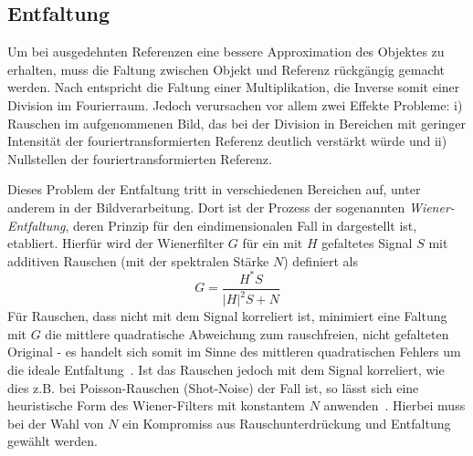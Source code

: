 \subsection{Entfaltung}
Um bei ausgedehnten Referenzen eine bessere Approximation des Objektes zu erhalten, muss die Faltung zwischen Objekt und Referenz rückgängig gemacht werden. Nach  entspricht die Faltung einer Multiplikation, die Inverse somit einer Division im Fourierraum. Jedoch verursachen vor allem zwei Effekte Probleme: i) Rauschen im aufgenommenen Bild, das bei der Division in Bereichen mit geringer Intensität der fouriertransformierten Referenz deutlich verstärkt würde und ii) Nullstellen der fouriertransformierten Referenz. 

Dieses Problem der Entfaltung tritt in verschiedenen Bereichen auf, unter anderem in der Bildverarbeitung.
Dort ist der Prozess der sogenannten \textit{Wiener-Entfaltung}, deren Prinzip für den eindimensionalen Fall in  dargestellt ist, etabliert. Hierfür wird der Wienerfilter $G$ für ein mit $H$ gefaltetes Signal $S$ mit additiven Rauschen (mit der spektralen Stärke $N$) definiert als
\begin{equation}
	G=\frac{H^* S}{\left|H\right|^2 S+N}
\end{equation}
Für Rauschen, dass nicht mit dem Signal korreliert ist, minimiert eine Faltung mit $G$ die mittlere quadratische Abweichung zum rauschfreien, nicht gefalteten Original - es handelt sich somit im Sinne des mittleren quadratischen Fehlers um die ideale Entfaltung~\cite{castleman1996}. Ist das Rauschen jedoch mit dem Signal korreliert, wie dies z.B. bei Poisson-Rauschen (Shot-Noise) der Fall ist, so lässt sich eine heuristische Form des Wiener-Filters mit konstantem $N$ anwenden~\cite{he2004}. Hierbei muss bei der Wahl von $N$ ein Kompromiss aus Rauschunterdrückung und Entfaltung gewählt werden.

